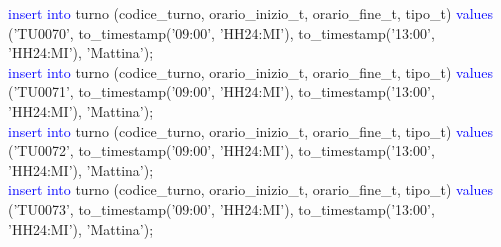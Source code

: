 \documentclass{article}
\begin{document}
\begin{flushleft}
{        \newpage
        \hspace*{0.5em}\textcolor{blue}{insert into} turno (codice\_turno, orario\_inizio\_t, orario\_fine\_t, tipo\_t) \textcolor{blue}{values} \hspace*{0.5em}('TU0070', to\_timestamp('09:00', 'HH24:MI'), to\_timestamp('13:00', 'HH24:MI'), \hspace*{0.5em}'Mattina'); \\
        \hspace*{0.5em}\textcolor{blue}{insert into} turno (codice\_turno, orario\_inizio\_t, orario\_fine\_t, tipo\_t) \textcolor{blue}{values} \hspace*{0.5em}('TU0071', to\_timestamp('09:00', 'HH24:MI'), to\_timestamp('13:00', 'HH24:MI'), \hspace*{0.5em}'Mattina'); \\
        \hspace*{0.5em}\textcolor{blue}{insert into} turno (codice\_turno, orario\_inizio\_t, orario\_fine\_t, tipo\_t) \textcolor{blue}{values} \hspace*{0.5em}('TU0072', to\_timestamp('09:00', 'HH24:MI'), to\_timestamp('13:00', 'HH24:MI'), \hspace*{0.5em}'Mattina'); \\
        \hspace*{0.5em}\textcolor{blue}{insert into} turno (codice\_turno, orario\_inizio\_t, orario\_fine\_t, tipo\_t) \textcolor{blue}{values} \hspace*{0.5em}('TU0073', to\_timestamp('09:00', 'HH24:MI'), to\_timestamp('13:00', 'HH24:MI'), \hspace*{0.5em}'Mattina'); \\}
    \end{flushleft}
\end{document}
